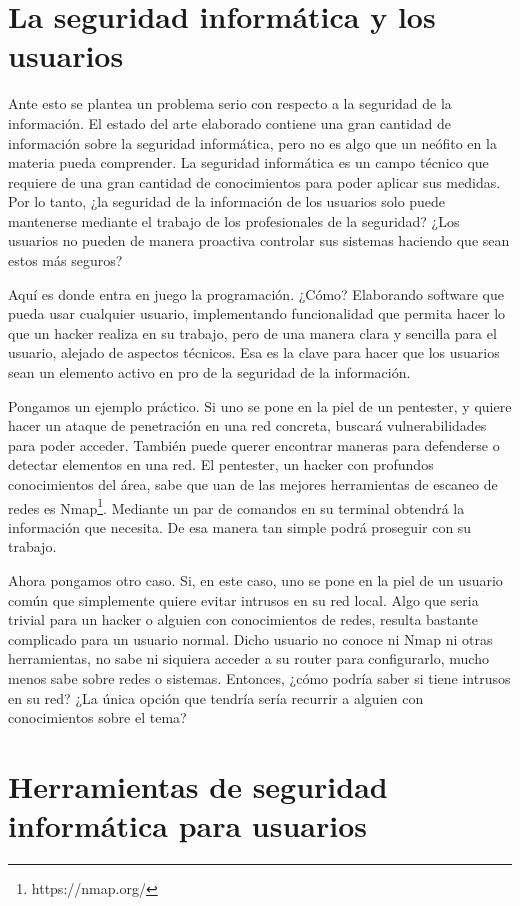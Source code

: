 \section{La seguridad informática y los usuarios}

Ante esto se plantea un problema serio con respecto a la seguridad de la información. El estado del arte elaborado contiene una gran cantidad de información sobre la seguridad informática, pero no es algo que un neófito en la materia pueda comprender. La seguridad informática es un campo técnico que requiere de una gran cantidad de conocimientos para poder aplicar sus medidas. Por lo tanto, ¿la seguridad de la información de los usuarios solo puede mantenerse mediante el trabajo de los profesionales de la seguridad? ¿Los usuarios no pueden de manera proactiva controlar sus sistemas haciendo que sean estos más seguros?

Aquí es donde entra en juego la programación. ¿Cómo? Elaborando software que pueda usar cualquier usuario, implementando funcionalidad que permita hacer lo que un hacker realiza en su trabajo, pero de una manera clara y sencilla para el usuario, alejado de aspectos técnicos. Esa es la clave para hacer que los usuarios sean un elemento activo en pro de la seguridad de la información.

Pongamos un ejemplo práctico. Si uno se pone en la piel de un pentester, y quiere hacer un ataque de penetración en una red concreta, buscará vulnerabilidades para poder acceder. También puede querer encontrar maneras para defenderse o detectar elementos en una red. El pentester, un hacker con profundos conocimientos del área, sabe que uan de las mejores herramientas de escaneo de redes es Nmap\footnote{https://nmap.org/}. Mediante un par de comandos en su terminal obtendrá la información que necesita. De esa manera tan simple podrá proseguir con su trabajo.

Ahora pongamos otro caso. Si, en este caso, uno se pone en la piel de un usuario común que simplemente quiere evitar intrusos en su red local. Algo que seria trivial para un hacker o alguien con conocimientos de redes, resulta bastante complicado para un usuario normal. Dicho usuario no conoce ni Nmap ni otras herramientas, no sabe ni siquiera acceder a su router para configurarlo, mucho menos sabe sobre redes o sistemas. Entonces, ¿cómo podría saber si tiene intrusos en su red? ¿La única opción que tendría sería recurrir a alguien con conocimientos sobre el tema?

\section{Herramientas de seguridad informática para usuarios}

